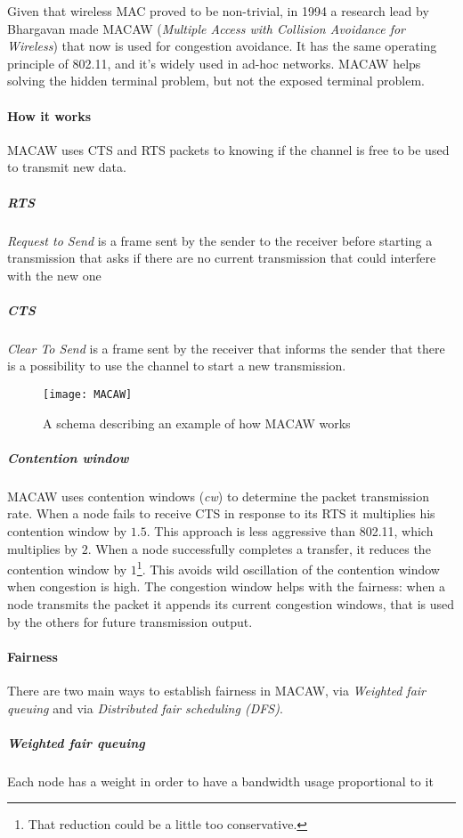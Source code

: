 Given that wireless MAC proved to be non-trivial, in 1994 a research lead by
Bhargavan made MACAW (\textit{Multiple Access with Collision Avoidance for
  Wireless}) that now is used for congestion avoidance. It has the same
operating principle of 802.11, and it's widely used in ad-hoc networks.
MACAW helps solving the hidden terminal problem, but not the exposed terminal
problem.

\paragraph*{How it works} 
MACAW uses CTS and RTS packets to knowing if the channel is free to be used to
transmit new data.

\subparagraph*{RTS} \textit{Request to Send} is a frame sent by the
sender to the receiver before starting a transmission that asks if there are no
current transmission that could interfere with the new one

\subparagraph*{CTS} \textit{Clear To Send} is a frame sent by the receiver
that informs the sender that there is a possibility to use the channel to start
a new transmission.

\begin{figure}[t]
  \centering
  \texttt{[image: MACAW]}
  \caption{A schema describing an example of how MACAW works}
\end{figure}


\subparagraph*{Contention window} MACAW uses contention windows (\textit{cw}) to
determine the packet transmission rate. When a node fails to receive CTS in
response to its RTS it multiplies his contention window by $1.5$. This approach
is less aggressive than 802.11, which multiplies by $2$. When a node
successfully completes a transfer, it reduces the contention window by
$1$\footnote{That reduction could be a little too conservative.}. This avoids
wild oscillation of the contention window when congestion is high.
The congestion window helps with the fairness: when a node transmits the
packet it appends its current congestion windows, that is used by the others
for future transmission output.

\paragraph*{Fairness}
There are two main ways to establish fairness in MACAW, via \textit{Weighted
  fair queuing} and via \textit{Distributed fair scheduling (DFS)}.

\subparagraph*{Weighted fair queuing} Each node has a weight in order to have a
bandwidth usage proportional to it

